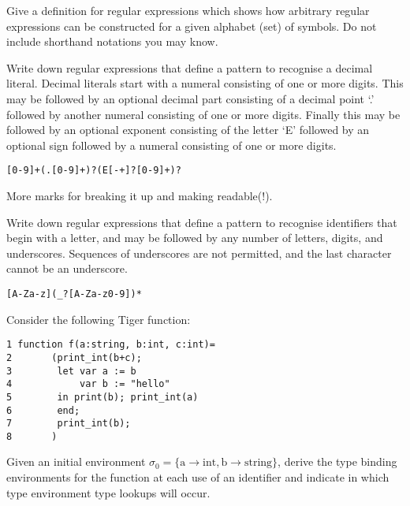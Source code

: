 \documentclass[11pt]{cityexam}
\begin{document}
\begin{questions}


\question

\begin{subquestions}


\subquestion
Give a definition for regular expressions which shows how
arbitrary regular expressions can be constructed for a
given alphabet (set) of symbols. Do not include shorthand
notations you may know.

\subquestion
Write down regular expressions that define a pattern to recognise 
a decimal literal. Decimal literals start with a numeral consisting of
one or more digits. This may be followed by an optional decimal part consisting
of a decimal point `.' followed by another numeral consisting of
one or more digits. Finally this may be followed by an optional exponent
consisting of the letter `E' followed by an optional sign followed 
by a numeral consisting of one or more digits.

\begin{modelanswer}
\begin{verbatim}
[0-9]+(.[0-9]+)?(E[-+]?[0-9]+)?
\end{verbatim}
More marks for breaking it up and making readable(!).
\end{modelanswer}


\subquestion
Write down regular expressions that define a pattern to recognise 
identifiers that begin with a letter, 
and may be followed by any number of
letters, digits, and underscores. 
Sequences of underscores are not permitted,
and the last character cannot be an underscore.

\begin{modelanswer}
\begin{verbatim}
[A-Za-z](_?[A-Za-z0-9])*
\end{verbatim}
\end{modelanswer}



\subquestion
Consider the following Tiger function:
\begin{verbatim}
1 function f(a:string, b:int, c:int)=
2       (print_int(b+c);
3        let var a := b
4            var b := "hello"
5        in print(b); print_int(a) 
6        end;
7        print_int(b);
8       )
\end{verbatim}
Given an initial environment $\sigma_0 = \{\textrm{a} \rightarrow \textrm{int}, \textrm{b} \rightarrow \textrm{string}\}$, 
derive the type binding environments for the function at each
use of an identifier and indicate in which type environment type
lookups will occur.


\end{subquestions}
\end{questions}
\end{document}
